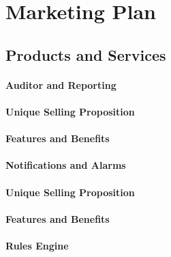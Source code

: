 {\let\cleardoublepage\relax \chapter{Marketing Plan}}



\section{Products and Services}


\subsubsection{Auditor and Reporting}

\subsubsection*{Unique Selling Proposition}

\subsubsection*{Features and Benefits}


\subsubsection{Notifications and Alarms}

\subsubsection*{Unique Selling Proposition}

\subsubsection*{Features and Benefits}


\subsubsection{Rules Engine}

